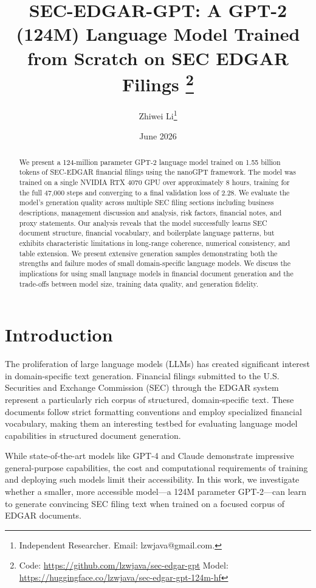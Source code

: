 \documentclass[12pt]{article}
\title{SEC-EDGAR-GPT: A GPT-2 (124M) Language Model Trained from Scratch on SEC EDGAR Filings%
\thanks{Code: \url{https://github.com/lzwjava/sec-edgar-gpt} \quad
Model: \url{https://huggingface.co/lzwjava/sec-edgar-gpt-124m-hf}}}
\author{
  Zhiwei Li\thanks{Independent Researcher. Email: lzwjava@gmail.com.}
}
\date{June 2026}
\begin{document}
\maketitle

\begin{abstract}
We present a 124-million parameter GPT-2 language model trained on 1.55 billion tokens of SEC-EDGAR financial filings using the nanoGPT framework. The model was trained on a single NVIDIA RTX 4070 GPU over approximately 8 hours, training for the full 47,000 steps and converging to a final validation loss of 2.28. We evaluate the model's generation quality across multiple SEC filing sections including business descriptions, management discussion and analysis, risk factors, financial notes, and proxy statements. Our analysis reveals that the model successfully learns SEC document structure, financial vocabulary, and boilerplate language patterns, but exhibits characteristic limitations in long-range coherence, numerical consistency, and table extension. We present extensive generation samples demonstrating both the strengths and failure modes of small domain-specific language models. We discuss the implications for using small language models in financial document generation and the trade-offs between model size, training data quality, and generation fidelity.
\end{abstract}

\section{Introduction}

The proliferation of large language models (LLMs) has created significant interest in domain-specific text generation. Financial filings submitted to the U.S. Securities and Exchange Commission (SEC) through the EDGAR system represent a particularly rich corpus of structured, domain-specific text. These documents follow strict formatting conventions and employ specialized financial vocabulary, making them an interesting testbed for evaluating language model capabilities in structured document generation.

While state-of-the-art models like GPT-4 and Claude demonstrate impressive general-purpose capabilities, the cost and computational requirements of training and deploying such models limit their accessibility. In this work, we investigate whether a smaller, more accessible model---a 124M parameter GPT-2---can learn to generate convincing SEC filing text when trained on a focused corpus of EDGAR documents.
\end{document}
